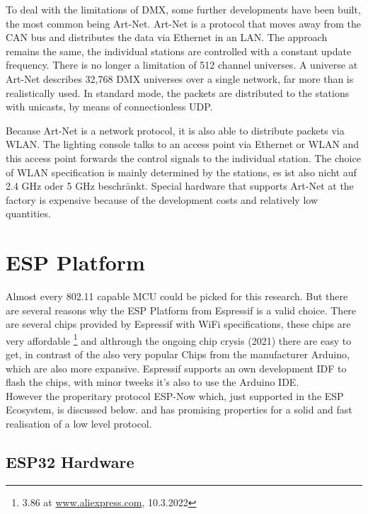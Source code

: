 To deal with the limitations of DMX, some further developments have been built, the most common being Art-Net.
Art-Net is a protocol that moves away from the CAN bus and distributes the data via Ethernet in an \ac{LAN}.
The approach remains the same, the individual stations are controlled with a constant update frequency.
There is no longer a limitation of 512 channel universes.
A universe at Art-Net describes 32,768 DMX universes over a single network, far more than is realistically used.
In standard mode, the packets are distributed to the stations with unicasts, by means of connectionless UDP.

Because Art-Net is a network protocol, it is also able to distribute packets via WLAN.
The lighting console talks to an access point via Ethernet or WLAN and this access point forwards the control signals to the individual station.
The choice of WLAN specification is mainly determined by the stations,
es ist also nicht auf 2.4 GHz oder 5 GHz beschränkt.
Special hardware that supports Art-Net at the factory is expensive because of the development costs and relatively low quantities.

\section{ESP Platform}

Almost every 802.11 capable \ac{MCU} could be picked for this research.
But there are several reasons why the ESP Platform from Espressif is a valid choice.
There are several chips provided by Espressif with WiFi specifications, these chips are very affordable
\footnote{3.86 at \url{www.aliexpress.com}, 10.3.2022}
and althrough the ongoing chip crysis (2021) there are easy to get, in contrast of the also very popular Chips from the manufacturer Arduino, which are also more expansive.
Espressif supports an own development IDF to flash the chips, with minor tweeks it's also to use the Arduino IDE.\\
However the properitary protocol ESP-Now which, just supported in the ESP Ecosystem, is discussed below.
and has promising properties for a solid and fast realisation of a low level protocol.

\subsection*{ESP32 Hardware}

